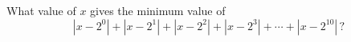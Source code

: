 What value of $x$ gives the minimum value of
\[
|x-2^0|+|x-2^1|+|x-2^2|+|x-2^3|+\cdots+|x-2^{10}|\,?
\]
